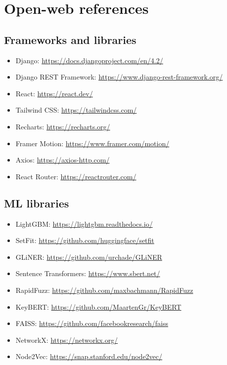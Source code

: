 \documentclass[11pt,a4paper,oneside]{book}
\begin{document}
\section{Open-web references}

\subsection{Frameworks and libraries}

\begin{itemize}
  \item Django: \url{https://docs.djangoproject.com/en/4.2/}
  \item Django REST Framework: \url{https://www.django-rest-framework.org/}
  \item React: \url{https://react.dev/}
  \item Tailwind CSS: \url{https://tailwindcss.com/}
  \item Recharts: \url{https://recharts.org/}
  \item Framer Motion: \url{https://www.framer.com/motion/}
  \item Axios: \url{https://axios-http.com/}
  \item React Router: \url{https://reactrouter.com/}
\end{itemize}

\subsection{ML libraries}

\begin{itemize}
  \item LightGBM: \url{https://lightgbm.readthedocs.io/}
  \item SetFit: \url{https://github.com/huggingface/setfit}
  \item GLiNER: \url{https://github.com/urchade/GLiNER}
  \item Sentence Transformers: \url{https://www.sbert.net/}
  \item RapidFuzz: \url{https://github.com/maxbachmann/RapidFuzz}
  \item KeyBERT: \url{https://github.com/MaartenGr/KeyBERT}
  \item FAISS: \url{https://github.com/facebookresearch/faiss}
  \item NetworkX: \url{https://networkx.org/}
  \item Node2Vec: \url{https://snap.stanford.edu/node2vec/}
\end{itemize}
\end{document}
